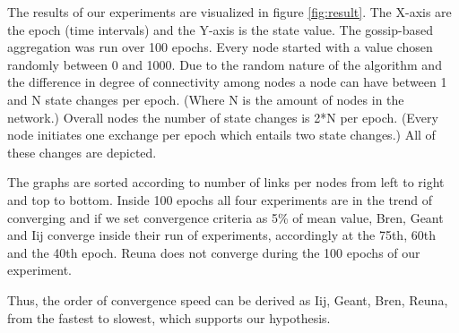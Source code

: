 The results of our experiments are visualized in figure \ref{fig:result}. The X-axis are the epoch (time intervals) and the Y-axis is the state value. The gossip-based aggregation was run over 100 epochs. Every node started with a value chosen randomly between 0 and 1000. Due to the random nature of the algorithm and the difference in degree of connectivity among nodes a node can have between 1 and N state changes per epoch. (Where N is the amount of nodes in the network.) Overall nodes the number of state changes is 2*N per epoch. (Every node initiates one exchange per epoch which entails two state changes.) All of these changes are depicted.

The graphs are sorted according to number of links per nodes from left to right and top to bottom. Inside 100 epochs all four experiments are in the trend of converging and if we set convergence criteria as 5\% of mean value, Bren, Geant and Iij converge inside their run of experiments, accordingly at the 75th, 60th and the 40th epoch. Reuna does not converge during the 100 epochs of our experiment.

Thus, the order of convergence speed can be derived as Iij, Geant, Bren, Reuna, from the fastest to slowest, which supports our hypothesis.

